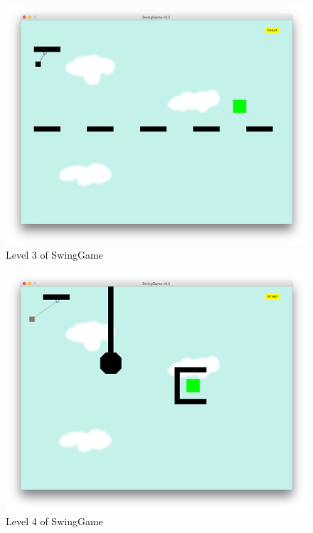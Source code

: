 \documentclass[]{report}
\begin{document}
\begin{appendices}
\begin{figure}[H]
			\label{level2}
		\end{figure}
		\begin{figure}[H]
			\centering
			\includegraphics[scale=0.25]{level3}
			\caption{Level 3 of SwingGame}
			\label{level3}
		\end{figure}
		\begin{figure}[H]
			\centering
			\includegraphics[scale=0.25]{level4}
			\caption{Level 4 of SwingGame}
			\label{level4}
		\end{figure}
		\begin{figure}[H]
			\centering

\end{figure}
\end{appendices}
\end{document}
